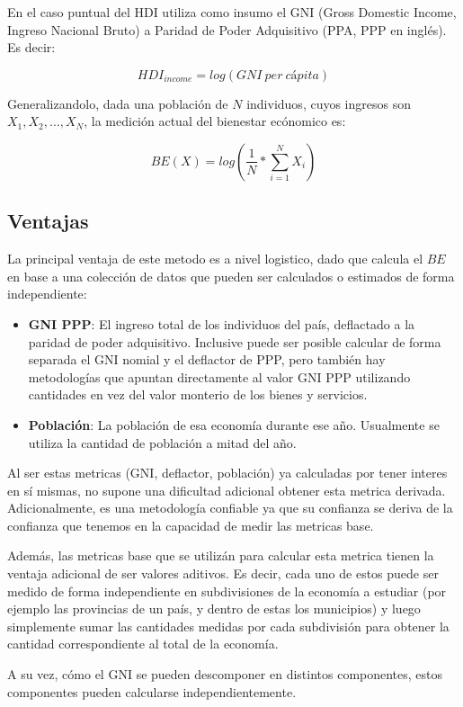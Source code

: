 En el caso puntual del HDI utiliza como insumo el GNI (Gross Domestic Income, Ingreso Nacional Bruto) a Paridad de Poder Adquisitivo (PPA, PPP en inglés). Es decir:

$$
HDI_{income} = log(GNI\ per\ cápita)
$$

Generalizandolo, dada una población de $N$ individuos, cuyos ingresos son $X_1, X_2, \dots, X_N$, la medición actual del bienestar ecónomico es:

$$
    BE(X) = log(\frac{1}{N} * \sum_{i=1}^{N}X_i)
$$

\subsection{Ventajas}

La principal ventaja de este metodo es a nivel logistico, dado que calcula el $BE$ en base a una colección de datos que pueden ser calculados o estimados de forma independiente:

\begin{itemize}
    \item \textbf{GNI PPP}: El ingreso total de los individuos del país, deflactado a la paridad de poder adquisitivo. Inclusive puede ser posible calcular de forma separada el GNI nomial y el deflactor de PPP, pero también hay metodologías que apuntan directamente al valor GNI PPP utilizando cantidades en vez del valor monterio de los bienes y servicios. 
    \item \textbf{Población}: La población de esa economía durante ese año. Usualmente se utiliza la cantidad de población a mitad del año.
\end{itemize}

Al ser estas metricas (GNI, deflactor, población) ya calculadas por tener interes en sí mismas, no supone una dificultad adicional obtener esta metrica derivada. Adicionalmente, es una metodología confiable ya que su confianza se deriva de la confianza que tenemos en la capacidad de medir las metricas base.

Además, las metricas base que se utilizán para calcular esta metrica tienen la ventaja adicional de ser valores aditivos. Es decir, cada uno de estos puede ser medido de forma independiente en subdivisiones de la economía a estudiar (por ejemplo las provincias de un país, y dentro de estas los municipios) y luego simplemente sumar las cantidades medidas por cada subdivisión para obtener la cantidad correspondiente al total de la economía. 

A su vez, cómo el GNI se pueden descomponer en distintos componentes, estos componentes pueden calcularse independientemente.

